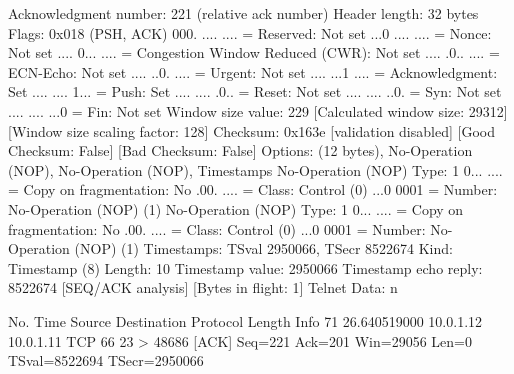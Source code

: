     Acknowledgment number: 221    (relative ack number)
    Header length: 32 bytes
    Flags: 0x018 (PSH, ACK)
        000. .... .... = Reserved: Not set
        ...0 .... .... = Nonce: Not set
        .... 0... .... = Congestion Window Reduced (CWR): Not set
        .... .0.. .... = ECN-Echo: Not set
        .... ..0. .... = Urgent: Not set
        .... ...1 .... = Acknowledgment: Set
        .... .... 1... = Push: Set
        .... .... .0.. = Reset: Not set
        .... .... ..0. = Syn: Not set
        .... .... ...0 = Fin: Not set
    Window size value: 229
    [Calculated window size: 29312]
    [Window size scaling factor: 128]
    Checksum: 0x163e [validation disabled]
        [Good Checksum: False]
        [Bad Checksum: False]
    Options: (12 bytes), No-Operation (NOP), No-Operation (NOP), Timestamps
        No-Operation (NOP)
            Type: 1
                0... .... = Copy on fragmentation: No
                .00. .... = Class: Control (0)
                ...0 0001 = Number: No-Operation (NOP) (1)
        No-Operation (NOP)
            Type: 1
                0... .... = Copy on fragmentation: No
                .00. .... = Class: Control (0)
                ...0 0001 = Number: No-Operation (NOP) (1)
        Timestamps: TSval 2950066, TSecr 8522674
            Kind: Timestamp (8)
            Length: 10
            Timestamp value: 2950066
            Timestamp echo reply: 8522674
    [SEQ/ACK analysis]
        [Bytes in flight: 1]
Telnet
    Data: n

No.     Time           Source                Destination           Protocol Length Info
     71 26.640519000   10.0.1.12             10.0.1.11             TCP      66     23 > 48686 [ACK] Seq=221 Ack=201 Win=29056 Len=0 TSval=8522694 TSecr=2950066

